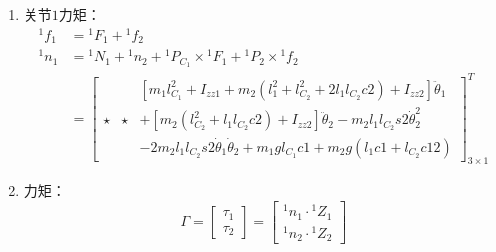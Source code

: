 \documentclass[
12pt, %
a4paper, 
oneside, %
headinclude,footinclude, %
]{scrartcl}
\begin{document}
{\begin{enumerate}
\begin{align*}
{}^1 n_2 &= {}^1 N_2 + {}^1 P_{C_2} \times {}^1 F_2 = \begin{bmatrix} 0 & 0 & (I_{zz2} + m_2 l_{C_2}^2)(\ddot{\theta}_1 + \ddot{\theta}_2) + m_2 l_1 l_{C_2}c2 \ddot{\theta}_1 - m_2 l_1 l_{C_2}s2 \dot{\theta}_1^2 + m_2 g l_{C_2}c12 \end{bmatrix}^T
\end{align*}
\item 关节$ 1 $力矩：
\begin{align*}
{}^1 f_1 &= {}^1 F_1 + {}^1 f_2 \\
{}^1 n_1 &= {}^1 N_1 + {}^1 n_2 + {}^1 P_{C_1} \times {}^1 F_1 + {}^1 P_2 \times {}^1 f_2 \\
&= \begin{bmatrix} 
& & [m_1 l_{C_1}^2 + I_{zz1} + m_2(l_1^2 + l_{C_2}^2 + 2l_1 l_{C_2}c2) + I_{zz2}]\ddot{\theta}_1 \\
\star & \star & + [m_2(l_{C_2}^2 + l_1 l_{C_2}c2) + I_{zz2}]\ddot{\theta}_2 - m_2 l_1 l_{C_2}s2 \dot{\theta}_2^2 \\
& & - 2m_2 l_1 l_{C_2}s2 \dot{\theta}_1 \dot{\theta}_2 + m_1 g l_{C_1}c1 + m_2 g(l_1 c1 + l_{C_2}c12) 
\end{bmatrix}^T_{3 \times 1}
\end{align*}
\item 力矩：
$$ \Gamma = \begin{bmatrix} \tau_1 \\ \tau_2 \end{bmatrix} = \begin{bmatrix} {}^1 n_1 \cdot {}^1 Z_1 \\ {}^1 n_2 \cdot {}^1 Z_2 \end{bmatrix} $$
\end{enumerate}
}
\end{document}
